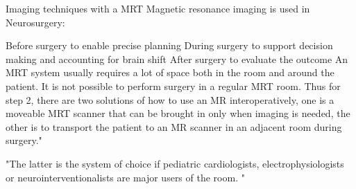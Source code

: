 	Imaging techniques with a MRT
	Magnetic resonance imaging is used in Neurosurgery:
	
	Before surgery to enable precise planning
	During surgery to support decision making and accounting for brain shift
	After surgery to evaluate the outcome
	An MRT system usually requires a lot of space both in the room and around the patient. It is not possible to perform surgery in a regular MRT room. Thus for step 2, there are two solutions of how to use an MR interoperatively, one is a moveable MRT scanner that can be brought in only when imaging is needed, the other is to transport the patient to an MR scanner in an adjacent room during surgery."
	
	"The latter is the system of choice if pediatric cardiologists, electrophysiologists or neurointerventionalists are major users of the room. "

